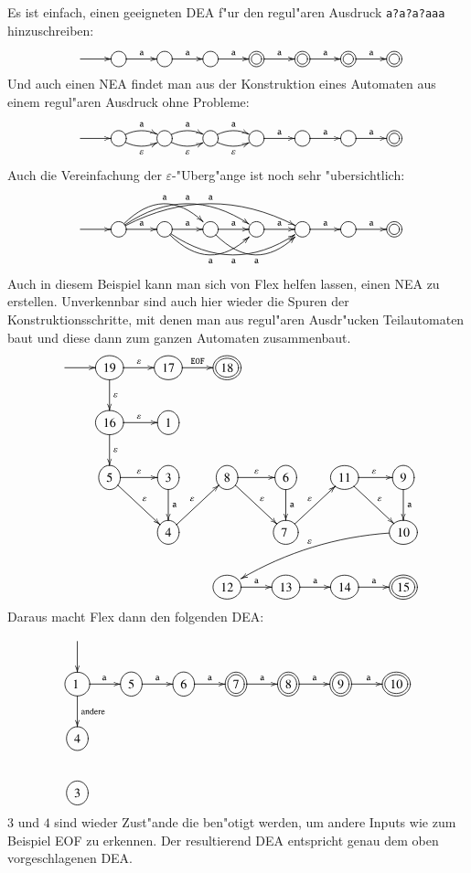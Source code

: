 Es ist einfach, einen geeigneten DEA f"ur den regul"aren
Ausdruck {\tt a?a?a?aaa} hinzuschreiben:
\[
\entrymodifiers={++[o][F]}
\xymatrix{
*+\txt{}\ar[r]
	&\ar[r]^{\tt a}
		&\ar[r]^{\tt a}
			&\ar[r]^{\tt a}
				&*++[o][F=]{}\ar[r]^{\tt a}
					&*++[o][F=]{}\ar[r]^{\tt a}
						&*++[o][F=]{}\ar[r]^{\tt a}
							&*++[o][F=]{}
}
\]
Und auch einen NEA findet man aus der Konstruktion eines Automaten
aus einem regul"aren Ausdruck ohne Probleme:
\[
\entrymodifiers={++[o][F]}
\xymatrix{
*+\txt{}\ar[r]
	&\ar@/^/[r]^{\tt a} \ar@/_/[r]_{\varepsilon}
		&\ar@/^/[r]^{\tt a} \ar@/_/[r]_{\varepsilon}
			&\ar@/^/[r]^{\tt a} \ar@/_/[r]_{\varepsilon}
				&\ar[r]^{\tt a}
					&\ar[r]^{\tt a}
						&\ar[r]^{\tt a}
							&*++[o][F=]{}
}
\]
Auch die Vereinfachung der $\varepsilon$-"Uberg"ange ist noch sehr
"ubersichtlich:
\[
\entrymodifiers={++[o][F]}
\xymatrix{
*+\txt{}\ar[r]
	&\ar[r]^{\tt a}
	\ar@/^20pt/[rr]^{\tt a}
	\ar@/^20pt/[rrr]^{\tt a}
	\ar@/^20pt/[rrrr]^{\tt a}
		&\ar[r]^{\tt a}
		\ar@/_20pt/[rr]_{\tt a}
		\ar@/_20pt/[rrr]_{\tt a}
			&\ar[r]^{\tt a} \ar@/_20pt/[rr]_{\tt a}
				&\ar[r]^{\tt a}
					&\ar[r]^{\tt a}
						&\ar[r]^{\tt a}
							&*++[o][F=]{}
}
\]
Auch in diesem Beispiel kann man sich von Flex helfen lassen,
einen NEA zu erstellen.  Unverkennbar sind auch hier wieder die
Spuren der Konstruktionsschritte, mit denen man aus regul"aren
Ausdr"ucken Teilautomaten baut und diese dann zum ganzen Automaten
zusammenbaut.
\[
\entrymodifiers={++[o][F]}
\xymatrix{
*+\txt{}\ar[r]
	&{19}\ar[d]^{\varepsilon}\ar[r]^{\varepsilon}
		&{17}\ar[r]^{\tt EOF}
			&*++[o][F=]{18}
\\
*+\txt{}
	&{16}\ar[d]^{\varepsilon} \ar[r]^{\varepsilon}
		&{1}
\\
*+\txt{}
	&{5} \ar[r]^{\varepsilon}
	      \ar[dr]^{\varepsilon}
		&{3} \ar[d]^{\tt a}
			&{8} \ar[r]^{\varepsilon}
			     \ar[dr]^{\varepsilon}
				&{6} \ar[d]^{\tt a}
					&{11} \ar[r]^{\varepsilon}
					     \ar[dr]^{\varepsilon}
						&{9} \ar[d]^{\tt a}
\\
*+\txt{}
	&*+\txt{}
		&{4} \ar[ur]^{\varepsilon}
			&*+\txt{}
				&{7} \ar[ur]^{\varepsilon}
					&*+\txt{}
						&{10} \ar@/_10pt/[dlll]_{\varepsilon}
\\
*+\txt{}
	&*+\txt{}
		&*+\txt{}
			&{12} \ar[r]^{\tt a}
				&{13} \ar[r]^{\tt a}
					&{14} \ar[r]^{\tt a}
						&*++[o][F=]{15}
}
\]
Daraus macht Flex dann den folgenden DEA:
\[
\entrymodifiers={++[o][F]}
\xymatrix{
*+\txt{}\ar[d]
\\
{1}\ar[r]^{\tt a} \ar[d]^{\text{andere}} \
	&{5}\ar[r]^{\tt a}
		&{6}\ar[r]^{\tt a}
			&*++[o][F=]{7} \ar[r]^{\tt a}
				&*++[o][F=]{8} \ar[r]^{\tt a}
					&*++[o][F=]{9} \ar[r]^{\tt a}
						&*++[o][F=]{10}
\\
{4}
\\
{3}
}
\]
$3$ und $4$ sind wieder Zust"ande die ben"otigt werden, um andere Inputs
wie zum Beispiel EOF zu erkennen. Der resultierend DEA entspricht genau
dem oben vorgeschlagenen DEA.

